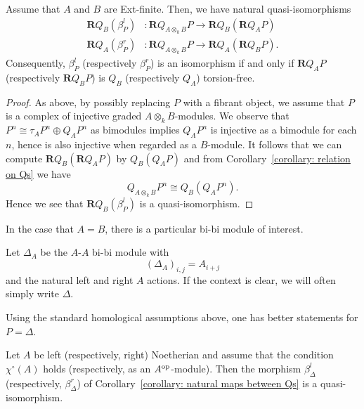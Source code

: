 \begin{proposition} \label{proposition: bi-torsion is a composition}
  Assume that \(A\) and \(B\) are Ext-finite. Then, we have natural quasi-isomorphisms 
  \begin{align*}
    \mathbf{R}Q_B(\beta^l_P) & : \mathbf{R}Q_{A \otimes_k B} P \to  \mathbf{R}Q_B(\mathbf{R}Q_A P) \\
    \mathbf{R}Q_A(\beta^r_P) & : \mathbf{R}Q_{A \otimes_k B} P \to  \mathbf{R}Q_A(\mathbf{R}Q_B P).
  \end{align*}
  Consequently, \(\beta^l_P\) (respectively \(\beta^r_P\)) is an isomorphism if and only if \(\mathbf{R}Q_A P\) (respectively \(\mathbf{R}Q_B P\)) is \(Q_B\) (respectively \(Q_A\)) torsion-free.
\end{proposition}


\begin{proof}
  As above, by possibly replacing \(P\) with a fibrant object, we assume that \(P\) is a complex of injective graded \(A \otimes_k B\)-modules.
  We observe that \(P^n \cong \tau_A P^n \oplus Q_A P^n\) as bimodules implies \(Q_A P^n\) is injective as a bimodule for each \(n\), hence is also injective when regarded as a \(B\)-module.
  It follows that we can compute \(\mathbf{R}Q_B(\mathbf{R}Q_A P)\) by \(Q_B(Q_A P)\)
  and from Corollary~\ref{corollary: relation on Qs} we have
  \[Q_{A \otimes_k B} P^n \cong Q_B(Q_A P^n).\]
  Hence we see that \(\mathbf{R}Q_B(\beta^l_P)\) is a quasi-isomorphism.
\end{proof}

In the case that \(A=B\), there is a particular bi-bi module of interest.

\begin{definition}
  Let \(\Delta_A\) be the \(A\)-\(A\) bi-bi module with 
  \begin{displaymath}
    (\Delta_A)_{i,j} = A_{i+j}
  \end{displaymath}
  and the natural left and right \(A\) actions. If the context is clear, we will often simply write \(\Delta\). 
\end{definition}

Using the standard homological assumptions above, one has better statements for \(P = \Delta\). 

\begin{proposition} \label{proposition: when beta is an isomorphism}
  Let \(A\) be left (respectively, right) Noetherian and assume that the condition \(\chi^\circ(A)\) holds (respectively, as an \(A^{\operatorname{op}}\)-module).
  Then the morphism \(\beta^l_{\Delta}\) (respectively, \(\beta^r_{\Delta}\)) of Corollary~\ref{corollary: natural maps between Qs} is a quasi-isomorphism.
  
\end{proposition}

